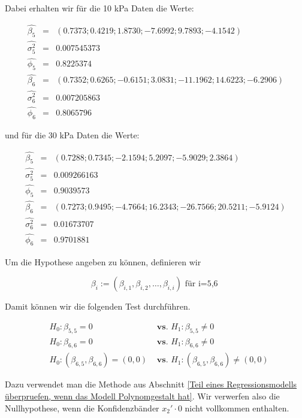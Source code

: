 \documentclass[12pt,a4paper]{article}
\theoremstyle{definition}
\theoremstyle{definition}
\theoremstyle{definition}
\theoremstyle{definition}
\begin{document}
Dabei erhalten wir für die 10 kPa Daten die Werte:

\begin{eqnarray*}
\hat{\beta_{5}} &=&  (0.7373 ; 0.4219 ; 1.8730 ; -7.6992 ; 9.7893 ; -4.1542)  \\
\hat{\sigma_{5}^2} &=& 0.007545373 \\
\hat{\phi_{5}} &=& 0.8225374 \\
\hat{\beta_{6}} &=& (0.7352 ; 0.6265 ; -0.6151 ; 3.0831 ; -11.1962 ; 14.6223 ; -6.2906)  \\
\hat{\sigma_{6}^2} &=& 0.007205863 \\
\hat{\phi_{6}} &=& 0.8065796
\end{eqnarray*}

und für die 30 kPa Daten die Werte:

\begin{eqnarray*}
\hat{\beta_{5}} &=& (0.7288 ; 0.7345 ; -2.1594 ; 5.2097 ; -5.9029 ; 2.3864)  \\
\hat{\sigma_{5}^2} &=& 0.009266163 \\
\hat{\phi_{5}} &=& 0.9039573 \\
\hat{\beta_{6}} &=& (0.7273 ; 0.9495 ; -4.7664 ; 16.2343 ; -26.7566 ; 20.5211 ; -5.9124)  \\
\hat{\sigma_{6}^2} &=& 0.01673707 \\
\hat{\phi_{6}} &=& 0.9701881
\end{eqnarray*}

Um die Hypothese angeben zu können, definieren wir 

\begin{equation*}
\beta_{i} := (\beta_{i,1}, \beta_{i,2}, \ldots, \beta_{i,i}) \text{ für i=5,6 }
\end{equation*}

Damit können wir die folgenden Test durchführen.

\begin{eqnarray*}
&H_0 : \beta_{5,5} = 0 &\textbf{ vs. } H_1 : \beta_{5,5} \neq 0 \\
&H_0 : \beta_{6,6} = 0 &\textbf{ vs. } H_1 : \beta_{6,6} \neq 0 \\
&H_0 : (\beta_{6,5}, \beta_{6,6}) = (0,0) &\textbf{ vs. } H_1 : (\beta_{6,5}, \beta_{6,6}) \neq (0,0)
\end{eqnarray*}

Dazu verwendet man die Methode aus Abschnitt \ref{Teil eines Regressionsmodells überpruefen, wenn das Modell Polynomgestalt hat}. Wir verwerfen also die Nullhypothese, wenn die Konfidenzbänder $x_2' \cdot 0$ nicht vollkommen enthalten. 
\end{document}
